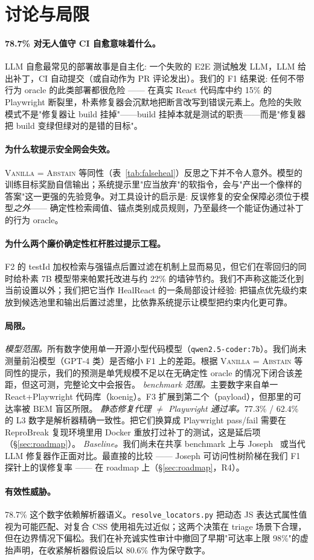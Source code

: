 \section{讨论与局限}
\label{sec:discussion}

\paragraph{78.7\% 对无人值守 CI 自愈意味着什么。}
LLM 自愈最常见的部署故事是自主化: 一个失败的 E2E 测试触发 LLM，LLM 给出补丁，CI 自动提交（或自动作为 PR 评论发出）。我们的 F1 结果说: 任何不带行为 oracle 的此类部署都很危险 —— 在真实 React 代码库中约 15\% 的 Playwright 断裂里，朴素修复器会沉默地把断言改写到错误元素上。危险的失败模式不是"修复器让 build 挂掉"——build 挂掉本就是测试的职责——而是"修复器把 build 变绿但绿对的是错的目标"。

\paragraph{为什么软提示安全网会失效。}
\textsc{Vanilla = Abstain} 等同性（表~\ref{tab:falseheal}）反思之下并不令人意外。模型的训练目标奖励自信输出；系统提示里"应当放弃"的软指令，会与"产出一个像样的答案"这一更强的先验竞争。对工具设计的启示是: 反误修复的安全保障必须位于模型\emph{之外}—— 确定性检索阈值、锚点类别成员规则，乃至最终一个能证伪通过补丁的行为 oracle。

\paragraph{为什么两个廉价确定性杠杆胜过提示工程。}
F2 的 testId 加权检索与强锚点后置过滤在机制上显而易见，但它们在零回归的同时给朴素 7B 模型带来帕累托改进与约 22\% 的墙钟节约。我们不声称这能泛化到当前设置以外；我们把它当作 HealReact 的一条局部设计经验: 把锚点优先级约束放到候选池里和输出后置过滤里，比依靠系统提示让模型把约束内化更可靠。

\paragraph{局限。}
\textit{模型范围。}所有数字使用单一开源小型代码模型（\texttt{qwen2.5-coder:7b}）。我们尚未测量前沿模型（GPT-4 类）是否缩小 F1 上的差距。根据 \textsc{Vanilla = Abstain} 等同性的提示，我们的预测是单凭规模不足以在无确定性 oracle 的情况下闭合该差距，但这可测，完整论文中会报告。
\textit{benchmark 范围。}主要数字来自单一 React+Playwright 代码库（koenig）。F3 扩展到第二个（payload），但那里的可达率被 BEM 盲区所限。
\textit{静态修复代理 $\ne$ Playwright 通过率。}77.3\% / 62.4\% 的 L3 数字是解析器精确一致性。把它们换算成 Playwright pass/fail 需要在 ReproBreak 复现环境里用 Docker 重放打过补丁的测试，这是延后项（\S\ref{sec:roadmap}）。
\textit{Baseline。}我们尚未在共享 benchmark 上与 Joseph~\cite{joseph2026zerocost} 或当代 LLM 修复器作正面对比。最直接的比较 —— Joseph 可访问性树阶梯在我们 F1 探针上的误修复率 —— 在 roadmap 上（\S\ref{sec:roadmap}，R4）。

\paragraph{有效性威胁。}
78.7\% 这个数字依赖解析器语义。\texttt{resolve\_locators.py} 把动态 JS 表达式属性值视为可能匹配、对复合 CSS 使用祖先过近似；这两个决策在 triage 场景下合理，但在边界情况下偏松。我们在补充诚实性审计中撤回了早期"可达率上限 98\%"的虚抬声明，在收紧解析器假设后以 80.6\% 作为保守数字。
